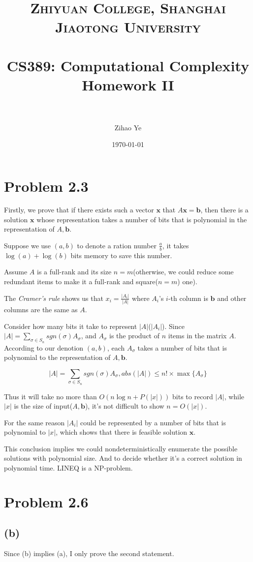 \documentclass[paper=a4, fontsize=11pt]{scrartcl} %
\title{
\normalfont \normalsize
\textsc{Zhiyuan College, Shanghai Jiaotong University} \\ %
\horrule{0.5pt} \\[0.4cm] %
\huge CS389: Computational Complexity Homework II \\ %
\horrule{2pt} \\ %
}
\author{Zihao Ye} %
\date{\normalsize\today} %
\numberwithin{equation}{section} %
\numberwithin{figure}{section} %
\numberwithin{table}{section} %
\begin{document}
\maketitle %

\section*{Problem 2.3}
Firstly, we prove that if there exists such a vector $\mathbf{x}$ that $A\mathbf{x} = \mathbf{b}$, then there is a solution $\mathbf{x}$ whose representation takes a number of bits that is polynomial in the representation of $A, \mathbf{b}$.

Suppose we use $(a, b)$ to denote a ration number $\frac{a}{b}$, it takes $\log(a) + \log(b)$ bits memory to save this number.

Assume $A$ is a full-rank and its size $n = m$(otherwise, we could reduce some redundant items to make it a full-rank and square($n = m$) one).

The \textit{Cramer's rule} shows us that $x_i = \frac{|A_i|}{|A|}$ where $A_i$'s $i$-th column is $\mathbf{b}$ and other columns are the same as $A$.

Consider how many bits it take to represent $|A|$($|A_i|$). Since $|A| = \sum_{\sigma\in S_n} \textit{sgn}(\sigma)A_\sigma$, and $A_\sigma$ is the product of $n$ items in the matrix $A$. According to our denotion $(a, b)$, each $A_\sigma$ takes a number of bits that is polynomial to the representation of $A, \mathbf{b}$.

$$|A| = \sum_{\sigma\in S_n} \textit{sgn}(\sigma)A_\sigma, \textit{abs}(|A|) \leq n! \times \max\{A_\sigma\} $$

Thus it will take no more than $O(n \log n + P(|x|))$ bits to record $|A|$, while $|x|$ is the size of input($A, \mathbf{b}$), it's not difficult to show $n = O(|x|)$. 

For the same reason $|A_i|$ could be represented by a number of bits that is polynomial to $|x|$, which shows that there is feasible solution $\mathbf{x}$.

This conclusion implies we could nondeterministically enumerate the possible solutions with polynomial size. And to decide whether it's a correct solution in polynomial time. LINEQ is a NP-problem.
\section*{Problem 2.6}
\subsection*{(b)}
Since (b) implies (a), I only prove the second statement.
\end{document}
